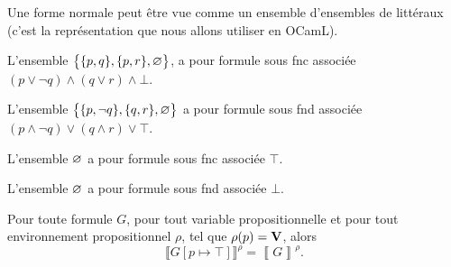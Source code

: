 \begin{rmk}
	Une forme normale peut être vue comme un ensemble d'ensembles de littéraux (c'est la représentation que nous allons utiliser en OCamL).
\end{rmk}

\begin{exm}\hfill
	\begin{multicols}{1}
		L'ensemble $\big\{\{p,q\},\{p,r\}, \varnothing\big\}$, a pour formule sous {\sc fnc}\/ associée $(p\lor \lnot q) \land (q \lor r) \land \bot$.

		L'ensemble $\big\{\{p,\lnot q\}, \{q,r\}, \varnothing\big\}$\/ a pour formule sous {\sc fnd}\/ associée $(p \land \lnot q) \lor (q \land r) \lor \top$.

		L'ensemble $\varnothing$\/ a pour formule sous {\sc fnc}\/ associée $\top$.

		L'ensemble $\varnothing$\/ a pour formule sous {\sc fnd}\/ associée $\bot$.
	\end{multicols}
\end{exm}

\begin{lem}
	Pour toute formule $G$, pour tout variable propositionnelle et pour tout environnement propositionnel $\rho$, tel que $\rho(p) = {\mathbf{V}}$, alors \[
		\Big\llbracket G[p \mapsto \top] \Big\rrbracket^\rho = \left\llbracket G \right\rrbracket^\rho
	.\]
\end{lem}

